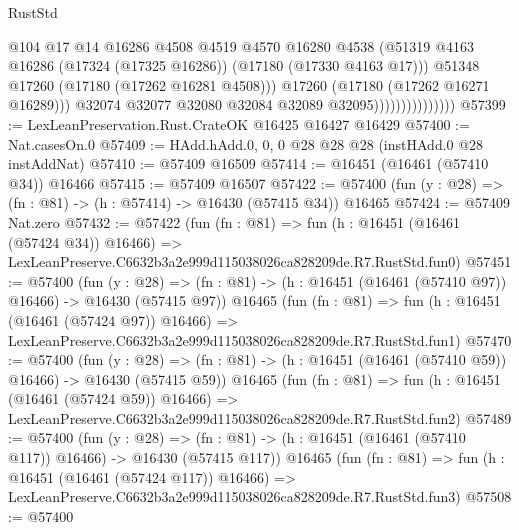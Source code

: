\begin{lexlean}{RustStd}
\begin{coremodule}
                                      @104
                                      @17
                                      @14
                                      @16286
                                      @4508
                                      @4519
                                      @4570
                                      @16280
                                      @4538
                                      (@51319
                                        @4163
                                        @16286
                                        (@17324 (@17325 @16286))
                                        (@17180 (@17330 @4163 @17)))
                                      @51348
                                      @17260
                                      (@17180 (@17262 @16281 @4508)))
                                    @17260
                                    (@17180 (@17262 @16271 @16289)))
                                  @32074
                                  @32077
                                  @32080
                                  @32084
                                  @32089
                                  @32095)))))))))))))))
@57399 := LexLeanPreservation.Rust.CrateOK @16425 @16427 @16429
@57400 := Nat.casesOn.{0}
@57409 := HAdd.hAdd.{0, 0, 0} @28 @28 @28 (instHAdd.{0} @28 instAddNat)
@57410 := @57409 @16509
@57414 := @16451 (@16461 (@57410 @34)) @16466
@57415 := @57409 @16507
@57422 := @57400 (fun (y : @28) => (fn : @81) -> (h : @57414) -> @16430 (@57415 @34)) @16465
@57424 := @57409 Nat.zero
@57432 := @57422
    (fun (fn : @81) =>
    fun (h : @16451 (@16461 (@57424 @34)) @16466) =>
    LexLeanPreserve.C6632b3a2e999d115038026ca828209de.R7.RustStd.fun0)
@57451 := @57400
    (fun (y : @28) =>
    (fn : @81) -> (h : @16451 (@16461 (@57410 @97)) @16466) -> @16430 (@57415 @97))
    @16465
    (fun (fn : @81) =>
    fun (h : @16451 (@16461 (@57424 @97)) @16466) =>
    LexLeanPreserve.C6632b3a2e999d115038026ca828209de.R7.RustStd.fun1)
@57470 := @57400
    (fun (y : @28) =>
    (fn : @81) -> (h : @16451 (@16461 (@57410 @59)) @16466) -> @16430 (@57415 @59))
    @16465
    (fun (fn : @81) =>
    fun (h : @16451 (@16461 (@57424 @59)) @16466) =>
    LexLeanPreserve.C6632b3a2e999d115038026ca828209de.R7.RustStd.fun2)
@57489 := @57400
    (fun (y : @28) =>
    (fn : @81) -> (h : @16451 (@16461 (@57410 @117)) @16466) -> @16430 (@57415 @117))
    @16465
    (fun (fn : @81) =>
    fun (h : @16451 (@16461 (@57424 @117)) @16466) =>
    LexLeanPreserve.C6632b3a2e999d115038026ca828209de.R7.RustStd.fun3)
@57508 := @57400

\end{coremodule}
\end{lexlean}

